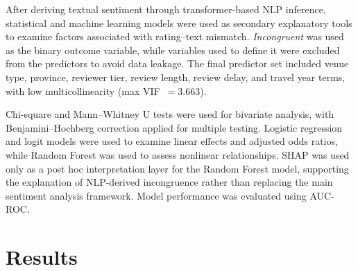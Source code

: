 \documentclass[conference]{IEEEtran}
\begin{document}
After deriving textual sentiment through transformer-based NLP inference, statistical and machine learning models were used as secondary explanatory tools to examine factors associated with rating--text mismatch. \textit{Incongruent} was used as the binary outcome variable, while variables used to define it were excluded from the predictors to avoid data leakage. The final predictor set included venue type, province, reviewer tier, review length, review delay, and travel year terms, with low multicollinearity (max VIF~$= 3.663$).

Chi-square and Mann--Whitney U tests were used for bivariate analysis, with Benjamini--Hochberg correction applied for multiple testing. Logistic regression and logit models were used to examine linear effects and adjusted odds ratios, while Random Forest was used to assess nonlinear relationships. SHAP was used only as a post hoc interpretation layer for the Random Forest model, supporting the explanation of NLP-derived incongruence rather than replacing the main sentiment analysis framework. Model performance was evaluated using AUC-ROC.

\begin{table}[htbp]
\caption{Modeling and Interpretation Framework}
\label{tab:model_framework}
\centering
{}
\end{table}

 

\section{Results}
\end{document}
